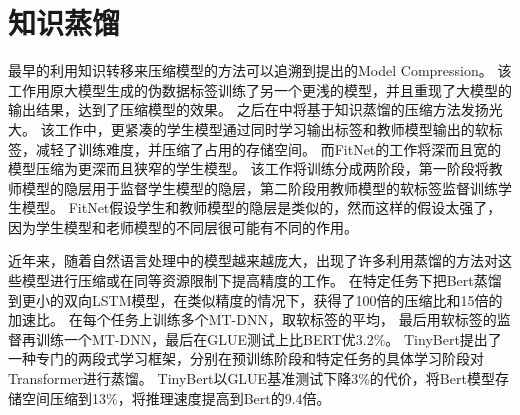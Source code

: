\section{知识蒸馏}
最早的利用知识转移来压缩模型的方法可以追溯到\citeauthor{buciluǎ2006model}提出的Model Compression\cite{buciluǎ2006model}。
该工作用原大模型生成的伪数据标签训练了另一个更浅的模型，并且重现了大模型的输出结果，达到了压缩模型的效果。
之后\citeauthor{hinton2015distilling}在\parencite{hinton2015distilling}中将基于知识蒸馏的压缩方法发扬光大。
该工作中，更紧凑的学生模型通过同时学习输出标签和教师模型输出的软标签，减轻了训练难度，并压缩了占用的存储空间。
而FitNet\cite{romero2014fitnets}的工作将深而且宽的模型压缩为更深而且狭窄的学生模型。
该工作将训练分成两阶段，第一阶段将教师模型的隐层用于监督学生模型的隐层，第二阶段用教师模型的软标签监督训练学生模型。
FitNet假设学生和教师模型的隐层是类似的，然而这样的假设太强了，因为学生模型和老师模型的不同层很可能有不同的作用。

近年来，随着自然语言处理中的模型越来越庞大，出现了许多利用蒸馏的方法对这些模型进行压缩或在同等资源限制下提高精度的工作。
\parencite{tang2019distilling}在特定任务下把Bert蒸馏到更小的双向LSTM模型，在类似精度的情况下，获得了100倍的压缩比和15倍的加速比。
\parencite{liu2019improving}在每个任务上训练多个MT-DNN，取软标签的平均，
最后用软标签的监督再训练一个MT-DNN，最后在GLUE测试上比BERT优3.2\%。
TinyBert\cite{jiao2019tinybert}提出了一种专门的两段式学习框架，分别在预训练阶段和特定任务的具体学习阶段对Transformer进行蒸馏。
TinyBert以GLUE基准测试下降3\%的代价，将Bert模型存储空间压缩到13\%，将推理速度提高到Bert的9.4倍。